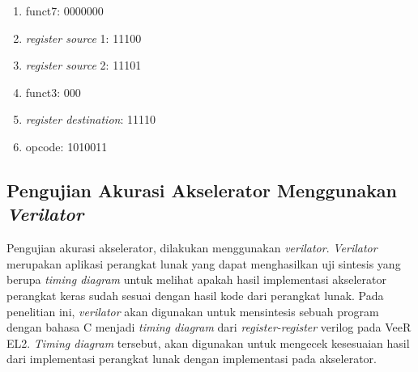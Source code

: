\begin{enumerate}
	\item funct7: 0000000
	\item \textit{register source} 1: 11100
	\item \textit{register source} 2: 11101
	\item funct3: 000
	\item \textit{register destination}: 11110
	\item opcode: 1010011
\end{enumerate}

\subsection{Pengujian Akurasi Akselerator Menggunakan \textit{Verilator}}
\label{subsec:verilator}

Pengujian akurasi akselerator, dilakukan menggunakan \textit{verilator}. \textit{Verilator} \parencite{verilator2024github} merupakan aplikasi perangkat lunak yang dapat menghasilkan uji sintesis yang berupa \textit{timing diagram} untuk melihat apakah hasil implementasi akselerator perangkat keras sudah sesuai dengan hasil kode dari perangkat lunak. Pada penelitian ini, \textit{verilator} akan digunakan untuk mensintesis sebuah program dengan bahasa C menjadi \textit{timing diagram} dari \textit{register-register} verilog pada VeeR EL2. \textit{Timing diagram} tersebut, akan digunakan untuk mengecek kesesuaian hasil dari implementasi perangkat lunak dengan implementasi pada akselerator.
